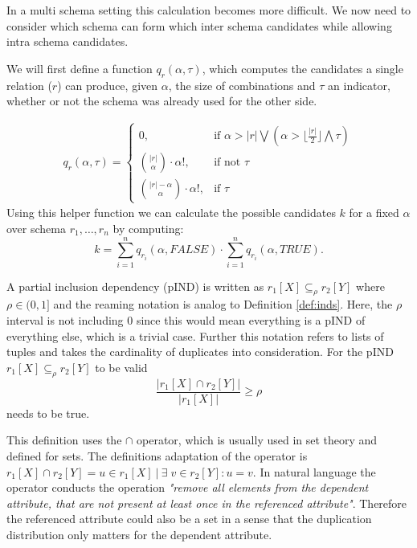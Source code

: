 \noindent In a multi schema setting this calculation becomes more difficult. We now need to consider which schema can form which inter schema candidates while allowing intra schema candidates.
\begin{definition}\label{def:candidates-MS}
    We will first define a function $q_r(\alpha, \tau)$, which computes the candidates a single relation ($r$) can produce, given $\alpha$, the size of combinations and $\tau$ an indicator, whether or not the schema was already used for the other side.

    \begin{align*}
        q_r(\alpha, \tau) = \begin{cases}
            0, & \text{if } \alpha > |r| \bigvee (\alpha > \lfloor\frac{|r|}{2}\rfloor \bigwedge \tau)\\
            \binom{|r|}{\alpha}\cdot \alpha!, & \text{if not } \tau \\
            \binom{|r| - \alpha}{\alpha}\cdot \alpha!, & \text{if } \tau
        \end{cases}
    \end{align*}
    Using this helper function we can calculate the possible candidates $k$ for a fixed $\alpha$ over schema $r_1, \dots, r_n$ by computing:
    $$
        k = \sum\limits_{i = 1}^n q_{r_i}(\alpha, FALSE) \cdot \sum\limits_{i = 1}^n q_{r_i}(\alpha, TRUE).
    $$
\end{definition}

\begin{definition}\label{def:pinds}
    A partial inclusion dependency (pIND) is written as $r_1[X] \subseteq_{\rho} r_2[Y]$ where $\rho \in (0, 1]$ and the reaming notation is analog to Definition \ref{def:inds}. Here, the $\rho$ interval is not including $0$ since this would mean everything is a pIND of everything else, which is a trivial case. Further this notation refers to lists of tuples and takes the cardinality of duplicates into consideration. For the pIND $r_1[X] \subseteq_{\rho} r_2[Y]$ to be valid
    $$
        \frac{|r_1[X] \cap r_2[Y]|}
            {|r_1[X]|} \geq \rho
    $$
    needs to be true.
\end{definition}

\noindent 
This definition uses the $\cap$ operator, which is usually used in set theory and defined for sets. 
The definitions adaptation of the operator is $r_1[X] \cap r_2[Y] = u \in r_1[X] \: | \: \exists \; v \in r_2[Y] : u = v$.
In natural language the operator conducts the operation \textit{"remove all elements from the dependent attribute, that are not present at least once in the referenced attribute"}. Therefore the referenced attribute could also be a set in a sense that the duplication distribution only matters for the dependent attribute.\\

